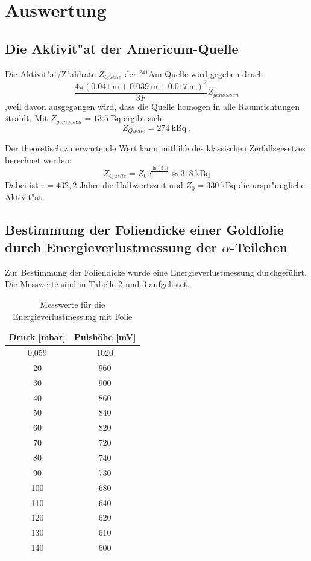 \section{Auswertung}
\label{sec:Auswertung}

\subsection{Die Aktivit"at der Americum-Quelle}
  Die Aktivit"at/Z"ahlrate $Z_{Quelle}$ der $^{241}\text{Am}$-Quelle wird gegeben druch
  \begin{equation}
    \frac{4\pi(\SI{0,041}{\meter}+\SI{0,039}{\meter}+\SI{0.017}{\meter})^2}{3F}Z_{gemessen}
  \end{equation}
  ,weil davon ausgegangen wird, dass die Quelle homogen in alle Raumrichtungen strahlt.
  Mit $Z_{gemessen}=\SI{13,5}{\becquerel}$ ergibt sich:
  \begin{equation}
    Z_{Quelle} = \SI{274}{\kilo \becquerel} \; .
  \end{equation}

  Der theoretisch zu erwartende Wert kann mithilfe des klassischen Zerfallsgesetzes berechnet werden:
  \begin{equation}
    Z_{Quelle} = Z_0\text{e}^{\frac{\ln(2)t}{\tau}} \approx \SI{318}{\kilo \becquerel}
  \end{equation}
  Dabei ist $\tau=432,2$ Jahre die Halbwertszeit und $Z_0=\SI{330}{\kilo \becquerel}$ \cite{Anleitung} die urspr"ungliche Aktivit"at.


\subsection{\texorpdfstring{Bestimmung der Foliendicke einer Goldfolie durch Energieverlustmessung der $\alpha$-Teilchen}{Bestimmung der Foliendicke einer Goldfolie durch Energieverlustmessung der alpha-Teilchen}}
Zur Bestimmung der Foliendicke wurde eine Energieverlustmessung durchgeführt.
Die Messwerte sind in Tabelle 2 und 3 aufgelistet. 
\begin{table}[H] 
	\centering
	\begin{tabular}{c|c}

		Druck  [mbar]& Pulshöhe [mV] \\ 
		\hline 
0,059	&1020 \\
20	&960 \\
30	&900\\
40	&860\\
50	&840\\
60	&820\\
70	&720\\
80	&740\\
90	&730\\
100	&680\\
110	&640\\
120	&620\\
130	&610\\
140	&600\\	
		
	\end{tabular} 
	\caption{Messwerte für die Energieverlustmessung mit Folie } 
\end{table}  


